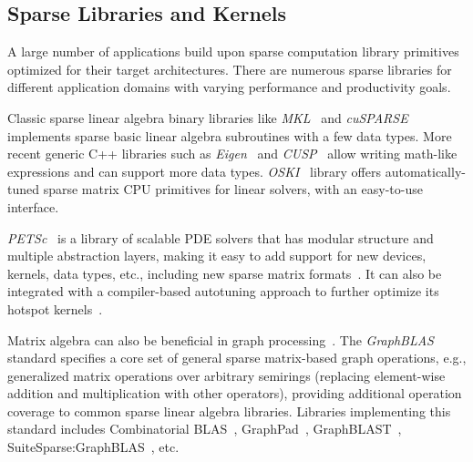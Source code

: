 \documentclass[10pt]{article}
\begin{document}
\subsection{Sparse Libraries and Kernels}

A large number of applications build upon sparse computation library primitives optimized for their target architectures. There are numerous sparse libraries for different application domains with varying performance and productivity goals.

Classic sparse linear algebra binary libraries like \emph{MKL}~\cite{wang2014mkl} and \emph{cuSPARSE}~\cite{naumov2010cusparse} implements sparse basic linear algebra subroutines with a few data types. More recent generic C++ libraries such as \emph{Eigen}~\cite{guennebaud2010eigen} and \emph{CUSP}~\cite{dalton2014cusp} allow writing math-like expressions and can support more data types. \emph{OSKI}~\cite{vuduc2005oski} library offers automatically-tuned sparse matrix CPU primitives for linear solvers, with an easy-to-use interface.

\emph{PETSc}~\cite{balay1997petsc} is a library of scalable PDE solvers that has modular structure and multiple abstraction layers, making it easy to add support for new devices, kernels, data types, etc., including new sparse matrix formats~\cite{kumbhar2011petsc-sparse-format-extension}. It can also be integrated with a compiler-based autotuning approach to further optimize its hotspot kernels~\cite{ramalingam2012petsc-compiler}.

Matrix algebra can also be beneficial in graph processing~\cite{harary1969graph}.  The \emph{GraphBLAS}~\cite{kepner2015graphblas-standard} standard specifies a core set of general sparse matrix-based graph operations, e.g., generalized matrix operations over arbitrary semirings (replacing element-wise addition and multiplication with other operators), providing additional operation coverage to common sparse linear algebra libraries. Libraries implementing this standard includes Combinatorial BLAS~\cite{buluc2011cblas}, GraphPad~\cite{anderson2016graphpad}, GraphBLAST~\cite{yang2019graphblast}, SuiteSparse:GraphBLAS~\cite{davis2019suitesparse-graphblas}, etc.
\end{document}

